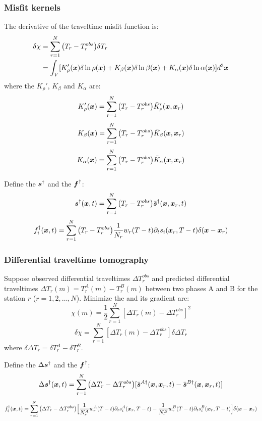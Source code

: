 \subsubsection{Misfit kernels}
The \Frechet derivative of the traveltime misfit function is:
\begin{align*}
  \delta\chi & =\sum_{r=1}^N\big(T_r-T_r^{obs}\big)\delta T_r \\
    & =\int_V[K_\rho'(\boldsymbol{x})\delta\ln\rho(\boldsymbol{x})+K_\beta(\boldsymbol{x})\delta\ln\beta(\boldsymbol{x})+K_\alpha(\boldsymbol{x})\delta\ln\alpha(\boldsymbol{x})]d^3\boldsymbol{x}
\end{align*}
where the 
$K_\rho'$, $K_\beta$ and $K_\alpha$ are:
\[ K_\rho'(\boldsymbol{x})=\sum_{r=1}^N\big(T_r-T_r^{obs}\big)\bar K_\rho'(\boldsymbol{x},\boldsymbol{x}_r) \]
\[ K_\beta(\boldsymbol{x})=\sum_{r=1}^N\big(T_r-T_r^{obs}\big)\bar K_\beta(\boldsymbol{x},\boldsymbol{x}_r) \]
\[ K_\alpha(\boldsymbol{x})=\sum_{r=1}^N\big(T_r-T_r^{obs}\big)\bar K_\alpha(\boldsymbol{x},\boldsymbol{x}_r) \]

Define the  $\boldsymbol{s}^\dagger$
and the  $\boldsymbol{f}^\dagger$:
\[ \boldsymbol{s}^\dagger(\boldsymbol{x},t)=\sum_{r=1}^N\big(T_r-T_r^{obs}\big)\bar{\boldsymbol{s}}^\dagger(\boldsymbol{x},\boldsymbol{x}_r,t) \]
\[ f_i^\dagger(\boldsymbol{x},t)=\sum_{r=1}^N\big(T_r-T_r^{obs}\big)\frac{1}{N_r}w_r(T-t)\partial_ts_i(\boldsymbol{x}_r,T-t)\delta(\boldsymbol{x}-\boldsymbol{x}_r) \]

\subsubsection{Differential traveltime tomography}
Suppose observed differential traveltimes $\Delta T_r^{obs}$
and predicted differential traveltimes $\Delta T_r(m)=T_r^A(m)-T_r^B(m)$
between two phases A and B for the station $r$ ($r=1,2,\ldots,N$).
Minimize the  and its gradient are:
\[ \chi(m)=\frac{1}{2}\sum_{r=1}^N[\Delta T_r(m)-\Delta T_r^{obs}]^2 \]
\[ \delta\chi=\sum_{r=1}^N[\Delta T_r(m)-\Delta T_r^{obs}]\delta\Delta T_r \]
where $\delta\Delta T_r=\delta T_r^A-\delta T_r^B$.

Define the  $\Delta\boldsymbol{s}^\dagger$
and the  $\boldsymbol{f}^\dagger$:
\[ \Delta\boldsymbol{s}^\dagger(\boldsymbol{x},t)=\sum_{r=1}^N\big(\Delta T_r-\Delta T_r^{obs}\big)[\bar{\boldsymbol{s}}^{A\dagger}(\boldsymbol{x},\boldsymbol{x}_r,t)-\bar{\boldsymbol{s}}^{B\dagger}(\boldsymbol{x},\boldsymbol{x}_r,t)] \]
\[ f_i^\dagger(\boldsymbol{x},t)=\sum_{r=1}^N\big(\Delta T_r-\Delta T_r^{obs}\big)\Big[\frac{1}{N_r^A}w_r^A(T-t)\partial_ts_i^A(\boldsymbol{x}_r,T-t)-\frac{1}{N_r^B}w_r^B(T-t)\partial_ts_i^B(\boldsymbol{x}_r,T-t)\Big]\delta(\boldsymbol{x}-\boldsymbol{x}_r) \]


